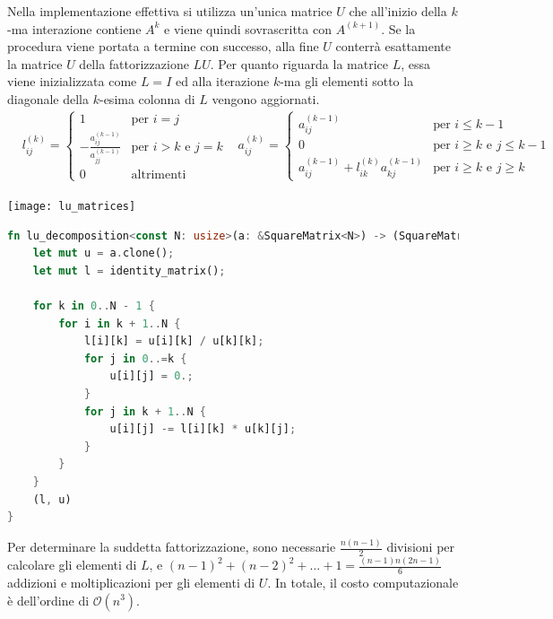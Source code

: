 \documentclass{article}
\begin{document}
Nella implementazione effettiva si utilizza un'unica matrice $U$ che
all'inizio della $k$-ma interazione contiene $A^{k}$ e viene quindi
sovrascritta con $A^{(k+1)}$. Se la procedura viene portata a termine con
successo, alla fine $U$ conterrà esattamente la matrice $U$ della
fattorizzazione $LU$. Per quanto riguarda la matrice $L$, essa viene
inizializzata come $L=I$ ed alla iterazione $k$-ma gli elementi sotto la
diagonale della $k$-esima colonna di $L$ vengono aggiornati.
\begin{equation*}
   \begin{aligned}
       & l_{ij}^{(k)}=\begin{cases}
           1 & \text{per }i=j\\ 
           -\frac{a_{ij}^{(k-1)}}{a_{jj}^{(k-1)}} & \text{per }i>k \text{ e }
           j=k \\ 
           0 & \text{altrimenti}
       \end{cases}
       & a_{ij}^{(k)}=\begin{cases}
           a_{ij}^{(k-1)} & \text{per }i\leq k-1 \\
           0 & \text{per }i\geq k \text{ e }j\leq k-1 \\ 
           a_{ij}^{(k-1)}+l_{ik}^{(k)}a_{kj}^{(k-1)} & \text{per }i\geq k\text{ e }j\geq
           k
       \end{cases}
   \end{aligned} 
\end{equation*}
\begin{center}
    \texttt{[image: lu\_matrices]}
\end{center}
\begin{lstlisting}[language=Rust]
fn lu_decomposition<const N: usize>(a: &SquareMatrix<N>) -> (SquareMatrix<N>, SquareMatrix<N>) {
    let mut u = a.clone();
    let mut l = identity_matrix();

    for k in 0..N - 1 {
        for i in k + 1..N {
            l[i][k] = u[i][k] / u[k][k];
            for j in 0..=k {
                u[i][j] = 0.;
            }
            for j in k + 1..N {
                u[i][j] -= l[i][k] * u[k][j];
            }
        }
    }
    (l, u)
}
\end{lstlisting}

Per determinare la suddetta fattorizzazione, sono necessarie $\frac{n(n-1)}{2}$
divisioni per calcolare gli elementi di $L$, e
$(n-1)^2+(n-2)^2+\ldots+1=\frac{(n-1)n(2n-1)}{6}$ addizioni e moltiplicazioni
per gli elementi di $U$. In totale, il costo computazionale è dell'ordine di
$\mathcal{O}(n^3)$.
\end{document}
